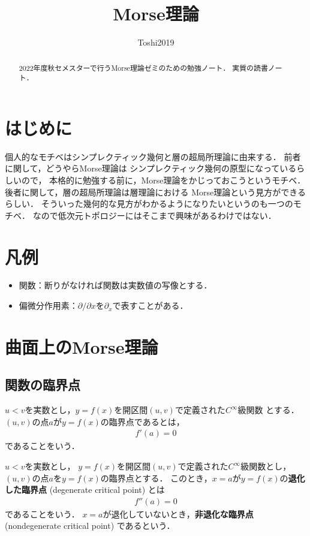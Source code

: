 \documentclass[11pt, a4paper, dvipdfmx]{jsarticle}
\theoremstyle{definition}
\newcommand{\p}{\partial}
\theoremstyle{mystyle}
\numberwithin{equation}{section} %
\begin{document}
\title{Morse理論}
\author{Toshi2019}


\maketitle
\begin{abstract}
2022年度秋セメスターで行うMorse理論ゼミのための勉強ノート．
実質\cite{M01}の読書ノート．
\end{abstract}

\section*{はじめに}
個人的なモチベはシンプレクティック幾何と層の超局所理論に由来する．
前者に関して，どうやらMorse理論は
シンプレクティック幾何の原型になっているらしいので，
本格的に勉強する前に，Morse理論をかじっておこうというモチベ．
後者に関して，層の超局所理論は層理論における
Morse理論という見方ができるらしい．
そういった幾何的な見方がわかるようになりたいというのも一つのモチベ．
なので低次元トポロジーにはそこまで興味があるわけではない．

\section*{凡例}
\begin{itemize}
    \item 関数：断りがなければ関数は実数値の写像とする．
    \item 偏微分作用素：$\p/{\p x}$を$\p_x$で表すことがある．
\end{itemize}

\section{曲面上のMorse理論}

\subsection{関数の臨界点}

$u<v$を実数とし，$y=f(x)$を開区間$(u,v)$で定義された$C^{\infty}$級関数
とする．$(u,v)$の点$a$が$y=f(x)$の臨界点であるとは，
\begin{align}
    f'(a)=0 \label{eq:1}
\end{align}
であることをいう．

$u<v$を実数とし，
$y=f(x)$を開区間$(u,v)$で定義された$C^{\infty}$級関数とし，
$(u,v)$の点$a$を$y=f(x)$の臨界点とする．
このとき，$x=a$が$y=f(x)$の\textbf{退化した臨界点} (degenerate critical point) とは
\begin{align}
    f''(a)=0
\end{align}
であることをいう．
$x=a$が退化していないとき，\textbf{非退化な臨界点} (nondegenerate critical point) であるという．
\end{document}
